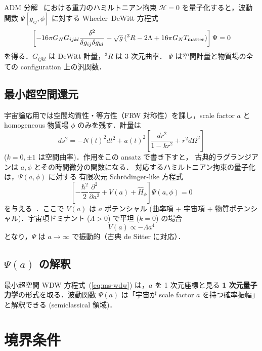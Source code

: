 \documentclass[11pt,a4paper]{article}
\begin{document}
ADM 分解~\cite{ADM1962} における重力のハミルトニアン拘束
$\mathcal{H} = 0$ を量子化すると，波動関数 $\Psi[g_{ij}, \phi]$ に対する
Wheeler--DeWitt 方程式
\begin{equation}
\left[-16\pi G_N G_{ijkl}\frac{\delta^2}{\delta g_{ij}\delta g_{kl}}
+ \sqrt{g}\,({}^3R - 2\Lambda + 16\pi G_N T_{\rm matter})\right]\Psi = 0
\end{equation}
を得る．$G_{ijkl}$ は DeWitt 計量，${}^3R$ は 3 次元曲率．
$\Psi$ は空間計量と物質場の全ての configuration 上の汎関数．

\subsection{最小超空間還元}

宇宙論応用では空間均質性・等方性（FRW 対称性）を課し，scale factor
$a$ と homogeneous 物質場 $\phi$ のみを残す．計量は
\begin{equation}
ds^2 = -N(t)^2 dt^2 + a(t)^2 \left[\frac{dr^2}{1-kr^2} + r^2 d\Omega^2\right]
\end{equation}
($k = 0, \pm 1$ は空間曲率)．作用をこの ansatz で書き下すと，
古典的ラグランジアンは $a, \phi$ とその時間微分の関数になる．
対応するハミルトニアン拘束の量子化は，$\Psi(a, \phi)$ に対する
有限次元 Schrödinger-like 方程式
\begin{equation}\label{eq:ms-wdw}
\left[-\frac{\hbar^2}{2}\frac{\partial^2}{\partial a^2}
+ V(a) + \hat{H}_\phi\right]\Psi(a,\phi) = 0
\end{equation}
を与える~\cite{Halliwell1990}．ここで $V(a)$ は $a$ ポテンシャル
(曲率項 + 宇宙項 + 物質ポテンシャル)．宇宙項ドミナント ($\Lambda > 0$)
で平坦 ($k=0$) の場合
\begin{equation}
V(a) \propto -\Lambda a^4
\end{equation}
となり，$\Psi$ は $a \to \infty$ で振動的（古典 de Sitter に対応）．

\subsection{$\Psi(a)$ の解釈}

最小超空間 WDW 方程式~(\ref{eq:ms-wdw}) は，$a$ を 1 次元座標と見る
\textbf{1 次元量子力学}の形式を取る．波動関数 $\Psi(a)$ は「宇宙が
scale factor $a$ を持つ確率振幅」と解釈できる (semiclassical 領域)．

\section{境界条件}
\end{document}
